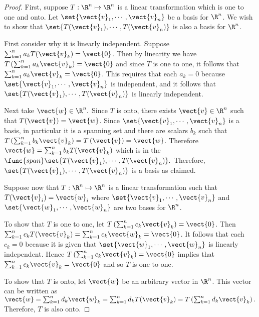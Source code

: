\begin{proof}
First, suppose $T:\R^n \mapsto \R^n$ is a linear
transformation which is one to one and onto. Let $\set{
\vect{v}_{1},\cdots ,\vect{v}_{n}} $ be a basis for
$\R^n$. We wish to show that $\set{T(\vect{v}_{1}),\cdots ,
T(\vect{v}_{n})} $ is also a basis for $\R^n$. 

First consider why it is linearly independent. Suppose
$\sum_{k=1}^{n}a_{k}T(\vect{v}_{k})=\vect{0}$. Then by linearity we have $T\left(
\sum_{k=1}^{n}a_{k}\vect{v}_{k}\right) =\vect{0}$ and since $T$ is one
to one, it follows that $\sum_{k=1}^{n}a_{k}\vect{v}_{k}=\vect{0}$.
This requires that  each $a_{k}=0$ because $\set{\vect{v}_{1},\cdots,
\vect{v}_{n}} $ is independent, and it follows that $\set{
T(\vect{v}_{1}),\cdots , T(\vect{v}_{n})} $ is linearly
independent. 


Next take $\vect{w}\in \R^n.$ Since $T$ is onto,
there exists $\vect{v}\in \R^n$ such that
$T(\vect{v})=\vect{w}$. Since $ \set{\vect{v}_{1},\cdots
,\vect{v}_{n}} $ is a basis, in particular it is a spanning set
and there are scalars $b_{k}$ such that $T\left(
\sum_{k=1}^{n}b_{k}\vect{v} _{k}\right) =T\left( \vect{v}\right)
=\vect{w}$. Therefore $\vect{w} =\sum_{k=1}^{n}b_{k}T(\vect{v}_{k})$
which is in the $\func{span}\set{T(\vect{v}_{1}),\cdots ,
T(\vect{v}_{n})} .$ Therefore, $\set{T(\vect{v}_{1}),\cdots
,T(\vect{v}_{n}) } $ is a basis as claimed.

Suppose now that $T: \R^n \mapsto \R^n$ is a linear
transformation such that $T(\vect{v}_{i})=\vect{w}_{i}$ where
$\set{\vect{v} _{1},\cdots ,\vect{v}_{n}} $ and $\set{
\vect{w}_{1},\cdots , \vect{w}_{n}} $ are two bases for
$\R^n$. 

To show that $T$ is one to one, let $T\left(
\sum_{k=1}^{n}c_{k}\vect{v}_{k}\right) =\vect{0}$. Then
$\sum_{k=1}^{n}c_{k}T(\vect{v}_{k})=\sum_{k=1}^{n}c_{k}\vect{w}_{k}=\vect{
0}$. It follows that each $c_{k} = 0$ because it is given that
$\set{\vect{w} _{1},\cdots ,\vect{w}_{n}} $ is linearly
independent. Hence $T\left( \sum_{k=1}^{n}c_{k}\vect{v}_{k}\right)
=\vect{0}$ implies that $\sum_{k=1}^{n}c_{k}\vect{v}_{k}=\vect{0}$ and
so $T$ is one to one.  

To show that $T$ is onto, let $\vect{w}$ be an arbitrary vector in
$\R^n$. This vector can be written as $\vect{w} =
\sum_{k=1}^{n}d_k\vect{w}_k =
\sum_{k=1}^{n}d_{k}T(\vect{v}_{k})=T\left( \sum_{k=1}^{n}d_{k}
\vect{v}_{k}\right) .$  Therefore, $T$ is also onto. 
\end{proof}

